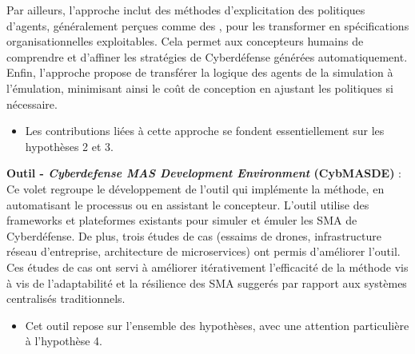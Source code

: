 Par ailleurs, l’approche inclut des méthodes d’explicitation des politiques d’agents, généralement perçues comme des , pour les transformer en spécifications organisationnelles exploitables. Cela permet aux concepteurs humains de comprendre et d’affiner les stratégies de Cyberdéfense générées automatiquement. Enfin, l'approche propose de transférer la logique des agents de la simulation à l’émulation, minimisant ainsi le coût de conception en ajustant les politiques si nécessaire.
\begin{itemize}
    \item Les contributions liées à cette approche se fondent essentiellement sur les hypothèses 2 et 3.
\end{itemize}

\textbf{Outil - \textit{Cyberdefense MAS Development Environment} (CybMASDE)} : Ce volet regroupe le développement de l’outil qui implémente la méthode, en automatisant le processus ou en assistant le concepteur. L’outil utilise des frameworks et plateformes existants pour simuler et émuler les SMA de Cyberdéfense. De plus, trois études de cas (essaims de drones, infrastructure réseau d’entreprise, architecture de microservices) ont permis d'améliorer l'outil. Ces études de cas ont servi à améliorer itérativement l’efficacité de la méthode vis à vis de l'adaptabilité et la résilience des SMA suggerés par rapport aux systèmes centralisés traditionnels.
\begin{itemize}
    \item Cet outil repose sur l’ensemble des hypothèses, avec une attention particulière à l’hypothèse 4.
\end{itemize}
